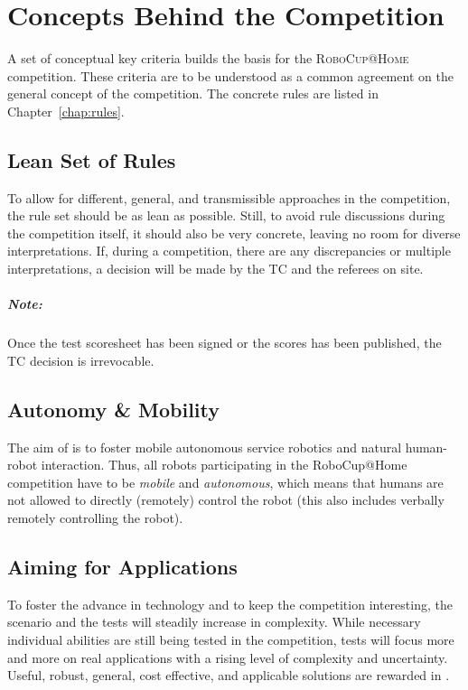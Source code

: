 \chapter{Concepts Behind the Competition}
\label{chap:concepts}

A set of conceptual key criteria builds the basis for the \textsc{RoboCup@Home} competition.
These criteria are to be understood as a common agreement on the general concept of the competition.
The concrete rules are listed in Chapter~\ref{chap:rules}.

\section{Lean Set of Rules}
\label{concept:lean_set_of_rules}

To allow for different, general, and transmissible approaches in the \AtHome{} competition, the rule set should be as lean as possible.
Still, to avoid rule discussions during the competition itself, it should also be very concrete, leaving no room for diverse interpretations.
If, during a competition, there are any discrepancies or multiple interpretations, a decision will be made by the TC and the referees on site.

\paragraph*{Note:} Once the test scoresheet has been signed or the scores has been published, the TC decision is irrevocable.

\section{Autonomy \& Mobility}
\label{concept:autonomy_and_mobility}

The aim of \AtHome{} is to foster mobile autonomous service robotics and natural human-robot interaction.
Thus, all robots participating in the RoboCup@Home competition have to be \emph{mobile} and \emph{autonomous}, which means that humans are not allowed to directly (remotely) control the robot (this also includes verbally remotely controlling the robot).

\section{Aiming for Applications}
\label{concept:aiming_for_applications}

To foster the advance in technology and to keep the competition interesting, the scenario and the tests will steadily increase in complexity.
While necessary individual abilities are still being tested in the competition, tests will focus more and more on real applications with a rising level of complexity and uncertainty.
Useful, robust, general, cost effective, and applicable solutions are rewarded in \AtHome.

